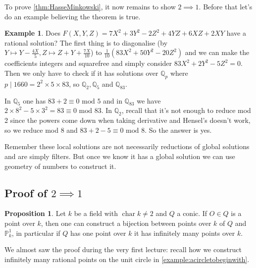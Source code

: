 \documentclass{article}
\newcommand{\Q}{\mathbb{Q}}
\newcommand{\p}{\mathbb{P}}
\newcommand{\Mod}{\text{ mod }}
\newcommand{\Char}{\operatorname{char}}
\theoremstyle{definition}
\newtheorem{prop}[defn]{Proposition}
\newtheorem{example}[defn]{Example}
\begin{document}
To prove \ref{thm:HasseMinkowski}, it now remains to show $2\implies 1$. Before that let's do an example believing the theorem is true.
\begin{example}
Does $F(X,Y,Z)=7X^2+3Y^2-2Z^2+4YZ+6XZ+2XY$ have a rational solution? The first thing is to diagonalise (by $Y\mapsto Y-\frac{4X}{5},Z\mapsto Z+Y+\frac{7X}{10}$) to $\frac{1}{10}(83X^2+50Y^2-20Z^2)$ and we can make the coefficients integers and squarefree and simply consider $83X^2+2Y^2-5Z^2=0$. Then we only have to check if it has solutions over $\Q_p$ where $p\mid 1660=2^2\times 5\times 83$, so $\Q_2,\Q_5$ and $\Q_{83}$.

In $\Q_5$ one has $83+2\equiv 0\Mod 5$ and in $\Q_{83}$ we have $2\times 8^2-5\times 3^2=83\equiv 0\Mod 83$. In $\Q_2$, recall that it's not enough to reduce mod 2 since the powers come down when taking derivative and Hensel's doesn't work, so we reduce mod 8 and $83+2-5\equiv 0\Mod 8$. So the answer is yes.

Remember these local solutions are not necessarily reductions of global solutions and are simply filters. But once we know it has a global solution we can use geometry of numbers to construct it.
\end{example}

\subsection{Proof of $2\implies 1$}
\begin{prop}
Let $k$ be a field with $\Char k\neq 2$ and $Q$ a conic. If $O\in Q$ is a point over $k$, then one can construct a bijection between points over $k$ of $Q$ and $\p_k^1$, in particular if $Q$ has one point over $k$ it has infinitely many points over $k$.
\end{prop}
We almost saw the proof during the very first lecture: recall how we construct infinitely many rational points on the unit circle in \ref{example:acircletobeginwith}.

\begin{center}
\end{center}
\end{document}

